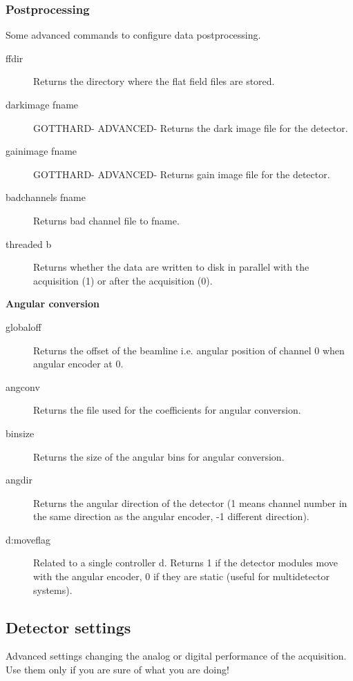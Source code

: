 \documentclass{article}
\begin{document}
\subsubsection{Postprocessing}
Some advanced commands to configure data postprocessing.
\begin{description}      
\item[ffdir] Returns the directory where the flat field files are stored.
\item[darkimage fname] GOTTHARD- ADVANCED- Returns the dark image file for the detector.       
\item[gainimage fname] GOTTHARD- ADVANCED- Returns gain image file for the detector. 
\item[badchannels fname] Returns bad channel file to fname.    
\item[threaded b] Returns whether the data are written to disk in parallel with the acquisition (1) or after the acquisition (0).      
\end{description}


\textbf{Angular conversion}

\begin{description}
\item[globaloff]   Returns the  offset  of the beamline i.e. angular position of channel 0 when angular encoder at 0. 
\item[angconv] Returns the file used for the coefficients for angular conversion.
\item[binsize] Returns the size of the angular bins for angular conversion. 
\item[angdir] Returns the angular direction of the detector (1 means channel number in the same direction as the angular encoder, -1 different direction). 
\item[d:moveflag]  Related to a single controller d. Returns 1 if the detector modules move with the angular encoder, 0 if they are static (useful for multidetector systems).
\end{description}



\subsection{Detector settings}
Advanced settings changing the analog or digital performance of the acquisition. Use them only if you are sure of what you are doing!
\end{document}
